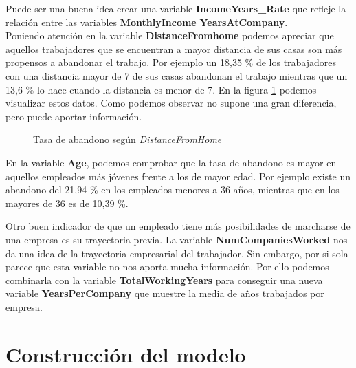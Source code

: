 Puede ser una buena idea crear una variable \textbf{IncomeYears\_Rate} que refleje la relación entre las variables \textbf{MonthlyIncome} \textbf{YearsAtCompany}.\\

Poniendo atención en la variable \textbf{DistanceFromhome} podemos apreciar que aquellos trabajadores que se encuentran a mayor distancia de sus casas son más propensos a abandonar el trabajo.
Por ejemplo un 18,35 \% de los trabajadores con una distancia mayor de 7 de sus casas abandonan el trabajo mientras que un 13,6 \% lo hace cuando la distancia es menor de 7. En la figura \ref{fig:attrition_distance} podemos visualizar estos datos. Como podemos observar no supone una gran diferencia, pero puede aportar información.\\


\begin{figure}
\centering
{}
\qquad
{}
\caption{Tasa de abandono según \textit{DistanceFromHome}}
\label{fig:attrition_distance}
\end{figure}


En la variable \textbf{Age}, podemos comprobar que la tasa de abandono es  mayor en aquellos empleados más jóvenes frente a los de mayor edad.
Por ejemplo existe un abandono del 21,94 \% en los empleados menores a 36 años, mientras que en los mayores de 36 es de 10,39 \%.

Otro buen indicador de que un empleado tiene más posibilidades de marcharse de una empresa es su trayectoria previa. La variable \textbf{NumCompaniesWorked} nos da una idea de la trayectoria empresarial del trabajador.
Sin embargo, por si sola parece que esta variable no nos aporta mucha información. Por ello podemos combinarla con la variable \textbf{TotalWorkingYears} para conseguir una nueva variable \textbf{YearsPerCompany} que muestre la media de años trabajados por empresa.\\





\section{Construcción del modelo}


